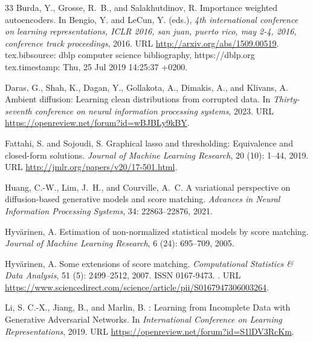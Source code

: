 \documentclass{article} %
\begin{document}
\begin{thebibliography}{33}
Burda, Y., Grosse, R.~B., and Salakhutdinov, R.
\newblock Importance weighted autoencoders.
\newblock In Bengio, Y. and LeCun, Y. (eds.), \emph{4th international conference on learning representations, {ICLR} 2016, san juan, puerto rico, may 2-4, 2016, conference track proceedings}, 2016.
\newblock URL \url{http://arxiv.org/abs/1509.00519}.
\newblock tex.bibsource: dblp computer science bibliography, https://dblp.org tex.timestamp: Thu, 25 Jul 2019 14:25:37 +0200.

Daras, G., Shah, K., Dagan, Y., Gollakota, A., Dimakis, A., and Klivans, A.
\newblock Ambient diffusion: {Learning} clean distributions from corrupted data.
\newblock In \emph{Thirty-seventh conference on neural information processing systems}, 2023.
\newblock URL \url{https://openreview.net/forum?id=wBJBLy9kBY}.

Fattahi, S. and Sojoudi, S.
\newblock Graphical lasso and thresholding: {Equivalence} and closed-form solutions.
\newblock \emph{Journal of Machine Learning Research}, 20 (10): 1--44, 2019.
\newblock URL \url{http://jmlr.org/papers/v20/17-501.html}.

Huang, C.-W., Lim, J.~H., and Courville, A.~C.
\newblock A variational perspective on diffusion-based generative models and score matching.
\newblock \emph{Advances in Neural Information Processing Systems}, 34: 22863--22876, 2021.

Hyv{\"a}rinen, A.
\newblock Estimation of non-normalized statistical models by score matching.
\newblock \emph{Journal of Machine Learning Research}, 6 (24): 695--709, 2005.

Hyvärinen, A.
\newblock Some extensions of score matching.
\newblock \emph{Computational Statistics \& Data Analysis}, 51 (5): 2499--2512, 2007.
\newblock ISSN 0167-9473.
\newblock {}.
\newblock URL \url{https://www.sciencedirect.com/science/article/pii/S0167947306003264}.

Li, S. C.-X., Jiang, B., and Marlin, B.
: {Learning} from {Incomplete} {Data} with {Generative} {Adversarial} {Networks}.
\newblock In \emph{International Conference on Learning Representations}, 2019{}.
\newblock URL \url{https://openreview.net/forum?id=S1lDV3RcKm}.


\end{thebibliography}
\end{document}

